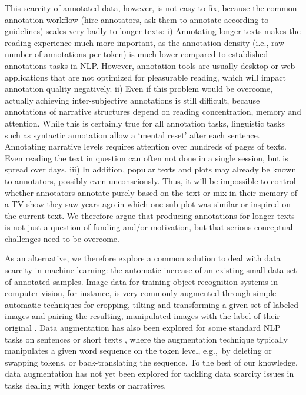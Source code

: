\documentclass[10pt, a4paper]{article}
\begin{document}
This scarcity of annotated data, however, is not easy to fix, because the common annotation workflow (hire annotators, ask them to annotate according to guidelines) scales very badly to longer texts: i) Annotating longer texts makes the reading experience much more important, as the annotation density (i.e., raw number of annotations per token) is much lower compared to established annotations tasks in NLP. However, annotation tools are usually desktop or web applications that are not optimized for pleasurable reading, which will impact annotation quality negatively. ii) Even if this problem would be overcome, actually achieving inter-subjective annotations is still difficult, because annotations of narrative structures depend on reading concentration, memory and attention. While this is certainly true for all annotation tasks, linguistic tasks such as syntactic annotation allow a `mental reset' after each sentence. Annotating narrative levels requires attention over hundreds of pages of texts. Even reading the text in question can often not done in a single session, but is spread over days.
iii) In addition, popular texts and plots may already be known to annotators, possibly even unconsciously. Thus, it will be impossible to control whether annotators annotate purely based on the text or mix in their memory of a TV show they saw years ago in which one sub plot was similar or inspired on the current text. We therefore argue that producing annotations for longer texts is not just a question of funding and/or motivation, but that serious conceptual challenges need to be overcome.

As an alternative, we therefore explore a common solution to deal with data scarcity in machine learning: the automatic increase of an existing small data set of annotated samples.
Image data for training object recognition systems in computer vision, for instance, is very commonly augmented through simple automatic techniques for cropping, tilting and transforming a given set of labeled images and pairing the resulting, manipulated images with the label of their original \cite{howard2013some,szegedy2015going}. 
Data augmentation has also been explored for some standard NLP tasks on sentences or short texts \cite{wang-etal-2018-switchout,wei-zou-2019-eda,liu-etal-2020-data}, where the augmentation technique typically manipulates a given word sequence on the token level, e.g.,~by deleting or swapping tokens, or back-translating the sequence.
To the best of our knowledge, data augmentation has not yet been explored for tackling data scarcity issues in tasks dealing with longer texts or narratives. 
\end{document}
